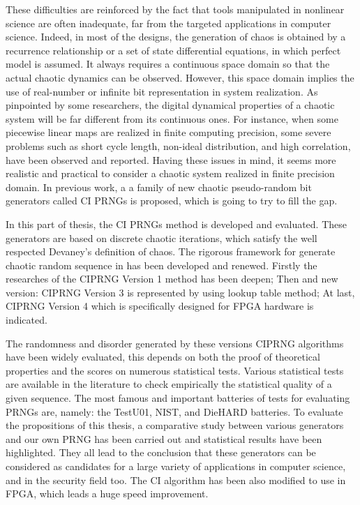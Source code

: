 These difficulties are reinforced by the fact that tools manipulated in nonlinear science are often inadequate, far from the targeted applications in computer science. Indeed, in most of the designs, the generation of chaos is obtained by a recurrence relationship or a set of state differential equations, in which perfect model is assumed. It always requires a continuous space domain so that the actual chaotic dynamics can be observed. However, this space domain implies the use of real-number or infinite bit representation in system realization. As pinpointed by some researchers, the digital dynamical properties of a chaotic system will be far different from its continuous ones. For instance, when some piecewise linear maps are realized in finite computing precision, some severe problems such as short cycle length, non-ideal distribution, and high correlation, have been observed and reported. Having these issues in mind, it seems more realistic and practical to consider a chaotic system realized in finite 
precision domain. In previous work, a a family of new chaotic pseudo-random bit generators called CI PRNGs is proposed, which is going to try to fill the gap.

In this part of thesis, the CI PRNGs method is developed and evaluated. These generators are based on discrete chaotic iterations, which satisfy the well respected Devaney's definition of chaos. The rigorous framework for generate chaotic random sequence in \cite{bibtexwangqianxue} has been developed and renewed. Firstly the researches of the CIPRNG Version 1 method has been deepen; Then and new version: CIPRNG Version 3 is represented by using lookup table method; At last, CIPRNG Version 4 which is specifically designed for FPGA hardware is indicated. 

The randomness and disorder generated by these versions CIPRNG algorithms have been widely evaluated, this depends on both the proof of theoretical properties and the scores on numerous statistical tests.  Various statistical tests are available in the literature to check empirically the statistical quality of a given sequence. The most famous and important batteries of tests for evaluating PRNGs are, namely: the TestU01, NIST, and DieHARD batteries. To evaluate the propositions of this thesis, a comparative study between various generators and our own PRNG has been carried out and statistical results have been highlighted.  They all lead to the conclusion that these generators can be considered as candidates for a large variety of applications in computer science, and in the security field too.  The CI algorithm has been also modified to use in FPGA, which leads a huge speed 
improvement.

